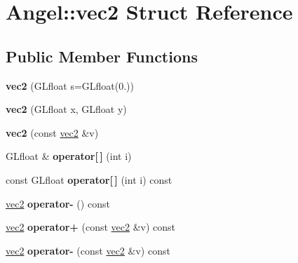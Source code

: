\hypertarget{struct_angel_1_1vec2}{\section{Angel\-:\-:vec2 Struct Reference}
\label{struct_angel_1_1vec2}
}
\subsection*{Public Member Functions}
\begin{DoxyCompactItemize}
\item 
\hypertarget{struct_angel_1_1vec2_ab2463ddb6aaaa67251004b90f03530fa}{{\bfseries vec2} (G\-Lfloat s=G\-Lfloat(0.))}\label{struct_angel_1_1vec2_ab2463ddb6aaaa67251004b90f03530fa}

\item 
\hypertarget{struct_angel_1_1vec2_a8e55cc0bb681ca7a747721cab122d830}{{\bfseries vec2} (G\-Lfloat x, G\-Lfloat y)}\label{struct_angel_1_1vec2_a8e55cc0bb681ca7a747721cab122d830}

\item 
\hypertarget{struct_angel_1_1vec2_aa2ec5b81c4b97019486b0595db6f35a1}{{\bfseries vec2} (const \hyperlink{struct_angel_1_1vec2}{vec2} \&v)}\label{struct_angel_1_1vec2_aa2ec5b81c4b97019486b0595db6f35a1}

\item 
\hypertarget{struct_angel_1_1vec2_a48235bf48a69717c273b72468d355244}{G\-Lfloat \& {\bfseries operator\mbox{[}$\,$\mbox{]}} (int i)}\label{struct_angel_1_1vec2_a48235bf48a69717c273b72468d355244}

\item 
\hypertarget{struct_angel_1_1vec2_a83725a082bca8ea73a2171bb4596c1bd}{const G\-Lfloat {\bfseries operator\mbox{[}$\,$\mbox{]}} (int i) const }\label{struct_angel_1_1vec2_a83725a082bca8ea73a2171bb4596c1bd}

\item 
\hypertarget{struct_angel_1_1vec2_a3b29693925c8026f75572dd13cefee5a}{\hyperlink{struct_angel_1_1vec2}{vec2} {\bfseries operator-\/} () const }\label{struct_angel_1_1vec2_a3b29693925c8026f75572dd13cefee5a}

\item 
\hypertarget{struct_angel_1_1vec2_a93606208e7b65d4bb8004f498b22934f}{\hyperlink{struct_angel_1_1vec2}{vec2} {\bfseries operator+} (const \hyperlink{struct_angel_1_1vec2}{vec2} \&v) const }\label{struct_angel_1_1vec2_a93606208e7b65d4bb8004f498b22934f}

\item 
\hypertarget{struct_angel_1_1vec2_a2d3d52e1b4693fdb860c2ef246e0d4d8}{\hyperlink{struct_angel_1_1vec2}{vec2} {\bfseries operator-\/} (const \hyperlink{struct_angel_1_1vec2}{vec2} \&v) const }\label{struct_angel_1_1vec2_a2d3d52e1b4693fdb860c2ef246e0d4d8}


\end{DoxyCompactItemize}
